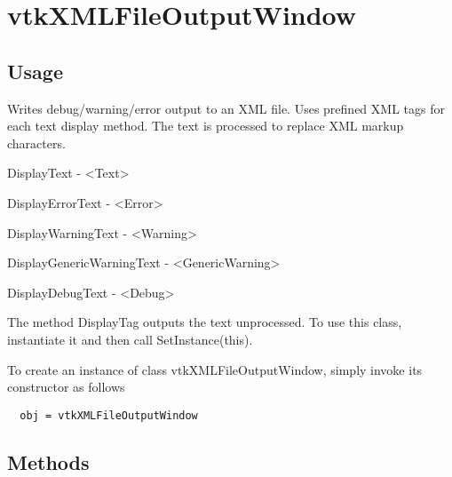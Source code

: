 \section{vtkXMLFileOutputWindow}

\subsection{Usage}

 Writes debug/warning/error output to an XML file. Uses prefined XML
 tags for each text display method. The text is processed to replace
 XML markup characters.
 
   DisplayText - <Text>
 
   DisplayErrorText - <Error>
 
   DisplayWarningText - <Warning>
 
   DisplayGenericWarningText - <GenericWarning>
 
   DisplayDebugText - <Debug>
 
 The method DisplayTag outputs the text unprocessed. To use this
 class, instantiate it and then call SetInstance(this).

To create an instance of class vtkXMLFileOutputWindow, simply
invoke its constructor as follows
\begin{verbatim}
  obj = vtkXMLFileOutputWindow
\end{verbatim}
\subsection{Methods}

